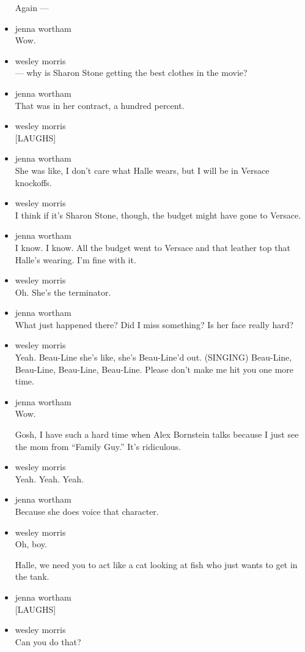\begin{itemize}
  Again ---
\item
  jenna wortham\\
  Wow.
\item
  wesley morris\\
  --- why is Sharon Stone getting the best clothes in the movie?
\item
  jenna wortham\\
  That was in her contract, a hundred percent.
\item
  wesley morris\\
  {[}LAUGHS{]}
\item
  jenna wortham\\
  She was like, I don't care what Halle wears, but I will be in Versace
  knockoffs.
\item
  wesley morris\\
  I think if it's Sharon Stone, though, the budget might have gone to
  Versace.
\item
  jenna wortham\\
  I know. I know. All the budget went to Versace and that leather top
  that Halle's wearing. I'm fine with it.
\item
  wesley morris\\
  Oh. She's the terminator.
\item
  jenna wortham\\
  What just happened there? Did I miss something? Is her face really
  hard?
\item
  wesley morris\\
  Yeah. Beau-Line she's like, she's Beau-Line'd out. (SINGING)
  Beau-Line, Beau-Line, Beau-Line, Beau-Line. Please don't make me hit
  you one more time.
\item
  jenna wortham\\
  Wow.

  Gosh, I have such a hard time when Alex Bornstein talks because I just
  see the mom from ``Family Guy.'' It's ridiculous.
\item
  wesley morris\\
  Yeah. Yeah. Yeah.
\item
  jenna wortham\\
  Because she does voice that character.
\item
  wesley morris\\
  Oh, boy.

  Halle, we need you to act like a cat looking at fish who just wants to
  get in the tank.
\item
  jenna wortham\\
  {[}LAUGHS{]}
\item
  wesley morris\\
  Can you do that?


\end{itemize}
